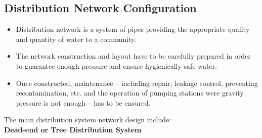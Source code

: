 \subsection{Distribution Network Configuration} 
\begin{itemize}
\item Distribution network is a system of pipes providing the appropriate quality and quantity of water to a community. 
\item The network construction and layout have to be carefully prepared in order to guarantee enough pressure and ensure hygienically safe water. 
\item Once constructed, maintenance – including repair, leakage control, preventing recontamination, etc. and the operation of pumping stations were gravity pressure is not enough – has to be ensured.
\end{itemize}

The main distribution system network design include:\\
\vspace{1cm}
    \textbf{Dead-end or Tree Distribution System}\\

